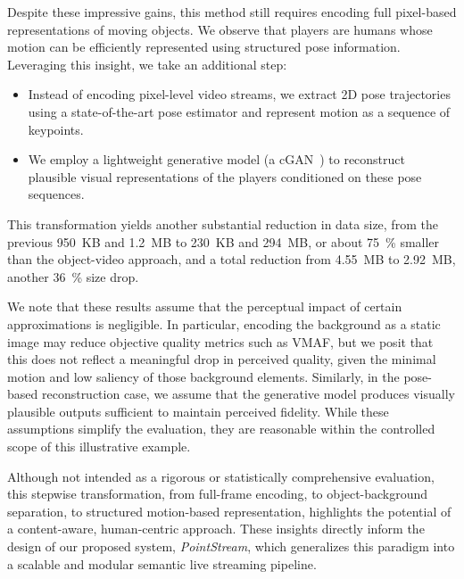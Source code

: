 \documentclass[manuscript, screen]{acmart}
\begin{document}
Despite these impressive gains, this method still requires encoding full pixel-based representations of moving objects. We observe that players are humans whose motion can be efficiently represented using structured pose information. 
Leveraging this insight, we take an additional step:
\begin{itemize}[topsep=0pt,itemsep=0pt,leftmargin=*]
\item Instead of encoding pixel-level video streams, we extract 2D pose trajectories using a state-of-the-art pose estimator and represent motion as a sequence of keypoints.
\item We employ a lightweight generative model (a cGAN~\cite{isola2017pix2pix}) to reconstruct plausible visual representations of the players conditioned on these pose sequences.
\end{itemize}
This transformation yields another substantial reduction in data size, from the previous \SI{950}{KB} and \SI{1.2}{MB} to \SI{230}{KB} and \SI{294}{MB}, or about \qty{75}{\percent} smaller than the object-video approach, and a total reduction from \SI{4.55}{MB} to \SI{2.92}{MB}, another \qty{36}{\percent} size drop.

We note that these results assume that the perceptual impact of certain approximations is negligible. 
In particular, encoding the background as a static image may reduce objective quality metrics such as VMAF, but we posit that this does not reflect a meaningful drop in perceived quality, given the minimal motion and low saliency of those background elements.
Similarly, in the pose-based reconstruction case, we assume that the generative model produces visually plausible outputs sufficient to maintain perceived fidelity. 
While these assumptions simplify the evaluation, they are reasonable within the controlled scope of this illustrative example.

Although not intended as a rigorous or statistically comprehensive evaluation, this stepwise transformation, from full-frame encoding, to object-background separation, to structured motion-based representation, highlights the potential of a content-aware, human-centric approach. 
These insights directly inform the design of our proposed system, \emph{PointStream}, which generalizes this paradigm into a scalable and modular semantic live streaming pipeline.
\end{document}
